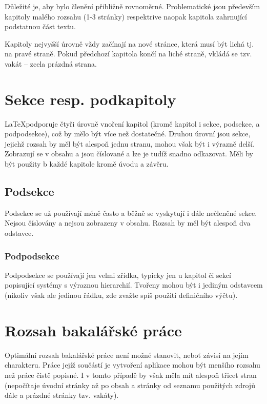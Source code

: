 \documentclass[male,czech]{kitheses}
\begin{document}
Důležité je, aby bylo členění přibližně rovnoměrné. Problematické jsou především kapitoly malého rozsahu (1-3 stránky) respektrive naopak kapitola zahrnující podstatnou část textu.

Kapitoly nejvyšší úrovně vždy začínají na nové stránce, která musí být lichá tj. na pravé straně. Pokud předchozí kapitola končí na liché straně, vkládá se tzv. vakát -- zcela prázdná strana. 

\section{Sekce resp. podkapitoly}

\LaTeX podporuje čtyři úrovně vnoření kapitol (kromě kapitol i sekce, podsekce, a podpodsekce), což by mělo být více než dostatečné. Druhou úrovní jsou sekce, jejichž rozsah by měl být alespoň jednu stranu, mohou však být
i výrazně delší. Zobrazují se v obsahu a jsou číslované a lze je tudíž snadno odkazovat. Měli by být použity b každé kapitole kromě úvodu a závěru.

\subsection{Podsekce}

Podsekce se už používají méně často a běžně se vyskytují i dále nečleněné sekce. Nejsou číslovány a nejsou zobrazeny v obsahu. Rozsah by měl být alespoň dva odstavce.

\subsubsection{Podpodsekce}

Podpodsekce se používají jen velmi zřídka, typicky jen u kapitol či sekcí popisující systémy s výraznou hierarchií. Tvořeny mohou být i jediným odstavcem (nikoliv však ale jedinou řádku, zde zvažte spíš použití definičního výčtu).

\section{Rozsah bakalářské práce}

Optimální rozsah bakalářské práce není možné stanovit, neboť závisí na jejím charakteru. Práce jejíž součástí je vytvoření aplikace mohou být menšího rozsahu než práce čistě popisné. I v tomto případě by však měla mít alespoň třicet stran (nepočítaje úvodní stránky až po obsah a stránky od seznamu použitých zdrojů dále a prázdné stránky tzv. vakáty).
\end{document}
